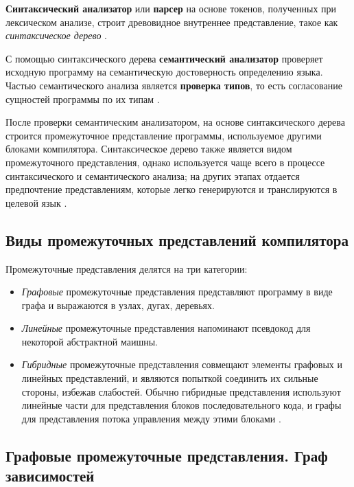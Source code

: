 \textbf{Синтаксический анализатор} или \textbf{парсер} на основе токенов,
полученных при лексическом анализе, строит древовидное внутреннее представление,
такое как \textit{синтаксическое дерево} \cite[с.~35]{dragonbook}.

С помощью синтаксического дерева \textbf{семантический анализатор} проверяет
исходную программу на семантическую достоверность определению языка. Частью
семантического анализа является \textbf{проверка типов}, то есть согласование
сущностей программы по их типам \cite[с.~37]{dragonbook}.

После проверки семантическим анализатором, на основе синтаксического
дерева строится промежуточное представление программы, используемое другими
блоками компилятора. Синтаксическое дерево также является видом промежуточного
представления, однако используется чаще всего в процессе синтаксического
и семантического анализа; на других этапах отдается предпочтение представлениям,
которые легко генерируются и транслируются в целевой язык \cite[с.~38]{dragonbook}.

\subsection{Виды промежуточных представлений компилятора}\label{sec:ch1/sec5/subsec3}

Промежуточные представления делятся на три категории:

\begin{itemize}
    \item \textit{Графовые} промежуточные представления
    представляют программу в виде графа и выражаются в
    узлах, дугах, деревьях.
    \item \textit{Линейные} промежуточные представления
    напоминают псевдокод для некоторой абстрактной маишны.
    \item \textit{Гибридные} промежуточные представления
    совмещают элементы графовых и линейных представлений,
    и являются попыткой соединить их сильные стороны, избежав
    слабостей. Обычно гибридные представления используют
    линейные части для представления блоков последовательного
    кода, и графы для представления потока управления между
    этими блоками \cite[с.~223]{engineeringacompiler}.
\end{itemize}

\subsection{Графовые промежуточные представления. Граф зависимостей}\label{sec:ch1/sec5/subsec4}

